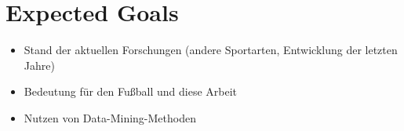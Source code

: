 \section{Expected Goals}

\begin{itemize}
\item Stand der aktuellen Forschungen (andere Sportarten, Entwicklung der letzten Jahre)
\item Bedeutung für den Fußball und diese Arbeit
\item Nutzen von Data-Mining-Methoden
\end{itemize}
